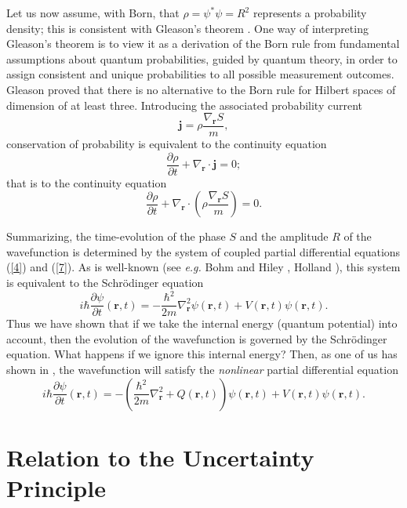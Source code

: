 \documentclass[12pt]{article}%
\begin{document}
Let us now assume, with Born, that $\rho=\psi^{\ast}\psi=R^{2}$ represents a
probability density; this is consistent with Gleason's theorem \cite{Gleason}.
One way of interpreting Gleason's theorem is to view it as a derivation of the
Born rule from fundamental assumptions about quantum probabilities, guided by
quantum theory, in order to assign consistent and unique probabilities to all
possible measurement outcomes. Gleason proved that there is no alternative to
the Born rule for Hilbert spaces of dimension of at least three. Introducing
the associated probability current
\begin{equation}
\mathbf{j}=\rho\frac{\nabla_{\mathbf{r}}S}{m}, \label{5}%
\end{equation}
conservation of probability is equivalent to the continuity equation%
\begin{equation}
\frac{\partial\rho}{\partial t}+\nabla_{\mathbf{r}}\cdot\mathbf{j}=0;
\label{6}%
\end{equation}
that is to the continuity equation%
\begin{equation}
\frac{\partial\rho}{\partial t}+\nabla_{\mathbf{r}}\cdot\left(  \rho
\frac{\nabla_{\mathbf{r}}S}{m}\right)  =0. \label{7}%
\end{equation}


Summarizing, the time-evolution of the phase $S$ and the amplitude $R$ of the
wavefunction is determined by the system of coupled partial differential
equations (\ref{4}) and (\ref{7}). As is well-known (see \textit{e.g.} Bohm
and Hiley \cite{bohipilot}, Holland \cite{Holland}), this system is equivalent
to the Schr\"{o}dinger equation%
\[
i\hbar\frac{\partial\psi}{\partial t}(\mathbf{r},t)=-\frac{\hbar^{2}}%
{2m}\nabla_{\mathbf{r}}^{2}\psi(\mathbf{r},t)+V(\mathbf{r},t)\psi
(\mathbf{r},t).
\]
Thus we have shown that if we take the internal energy (quantum potential)
into account, then the evolution of the wavefunction is governed by the
Schr\"{o}dinger equation. What happens if we ignore this internal energy?
Then, as one of us has shown in \cite{ICP}, the wavefunction will satisfy the
\emph{nonlinear} partial differential equation%
\[
i\hbar\frac{\partial\psi}{\partial t}(\mathbf{r},t)=-\left(  \frac{\hbar^{2}%
}{2m}\nabla_{\mathbf{r}}^{2}+Q(\mathbf{r},t)\right)  \psi(\mathbf{r}%
,t)+V(\mathbf{r},t)\psi(\mathbf{r},t).
\]


\section{Relation to the Uncertainty Principle}
\end{document}
